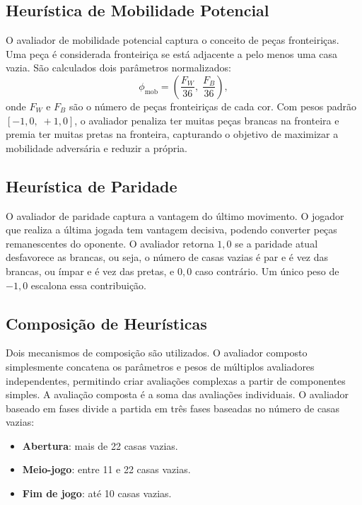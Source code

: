 \documentclass[12pt]{article}
\begin{document}
\subsection{Heurística de Mobilidade Potencial}
 
O avaliador de mobilidade potencial captura o conceito
de peças fronteiriças. Uma peça é considerada fronteiriça se está adjacente a pelo menos
uma casa vazia. 
São calculados dois parâmetros normalizados:
\begin{equation}
  \phi_{\text{mob}} = \left(\frac{F_W}{36},\; \frac{F_B}{36}\right),
\end{equation}
onde $F_W$ e $F_B$ são o número de peças fronteiriças de cada cor. Com pesos padrão
$[-1{,}0,\; +1{,}0]$, o avaliador penaliza ter muitas peças brancas na fronteira e premia
ter muitas pretas na fronteira, capturando o objetivo de maximizar a mobilidade adversária e reduzir a própria.
 
\subsection{Heurística de Paridade}
 
O avaliador de paridade captura a vantagem do último movimento.
O jogador que realiza a última jogada tem vantagem decisiva, podendo converter peças
remanescentes do oponente. O avaliador retorna $1{,}0$ se a paridade atual desfavorece as
brancas, ou seja, o número de casas vazias é par e é vez das brancas, ou ímpar e é vez das
pretas, e $0{,}0$ caso contrário. Um único peso de $-1{,}0$ escalona essa contribuição.
 
\subsection{Composição de Heurísticas}
 
Dois mecanismos de composição são utilizados. O avaliador composto simplesmente
concatena os parâmetros e pesos de múltiplos avaliadores independentes, permitindo criar
avaliações complexas a partir de componentes simples. A avaliação composta é a soma das
avaliações individuais. O avaliador baseado em fases divide a partida em três fases
baseadas no número de casas vazias:
 
\begin{itemize}
  \item \textbf{Abertura}: mais de 22 casas vazias.
  \item \textbf{Meio-jogo}: entre 11 e 22 casas vazias.
  \item \textbf{Fim de jogo}: até 10 casas vazias.
\end{itemize}
 
\end{document}
